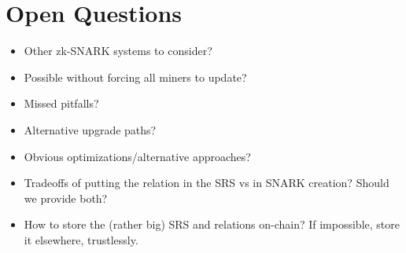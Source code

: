 \section{Open Questions}
  \begin{itemize}
    \item Other zk-SNARK systems to consider?
    \item Possible without forcing all miners to update?
    \item Missed pitfalls?
    \item Alternative upgrade paths?
    \item Obvious optimizations/alternative approaches?
    \item Tradeoffs of putting the relation in the SRS vs in SNARK creation?
    Should we provide both?
    \item How to store the (rather big) SRS and relations on-chain? If
    impossible, store it elsewhere, trustlessly.
  \end{itemize}
